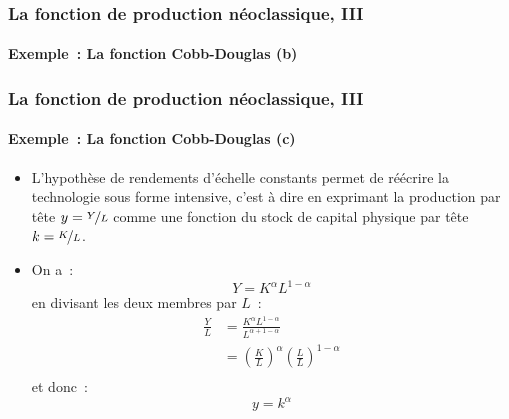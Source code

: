 \documentclass[10pt,notheorems]{beamer}
\theoremstyle{plain}
\theoremstyle{definition} %
\begin{document}
\begin{frame}
  \frametitle{La fonction de production néoclassique, III}
  \framesubtitle{Exemple~: La fonction Cobb-Douglas (b)}

  \begin{center}
  \end{center}
\end{frame}

\begin{frame}
  \frametitle{La fonction de production néoclassique, III}
  \framesubtitle{Exemple~: La fonction Cobb-Douglas (c)}

  \begin{itemize}
  \item L'hypothèse de rendements d'échelle constants permet de réécrire la technologie sous forme intensive, c'est à dire en exprimant la production par tête $y=\nicefrac{Y}{L}$ comme une fonction du stock de capital physique par tête $k = \nicefrac{K}{L}$.\newline

  \item On a~:
    \[
      Y = K^{\alpha}L^{1-\alpha}
    \]
    en divisant les deux membres par $L$~:
    \[
      \begin{split}
        \frac{Y}{L} &= \frac{K^{\alpha}L^{1-\alpha}}{L^{\alpha+1-\alpha}}\\
        &= \left(\frac{K}{L}\right)^{\alpha} \left(\frac{L}{L}\right)^{1-\alpha}\\
      \end{split}
    \]
    et donc~:
    \[
      y = k^{\alpha}
    \]
  \end{itemize}

\end{frame}
\end{document}
